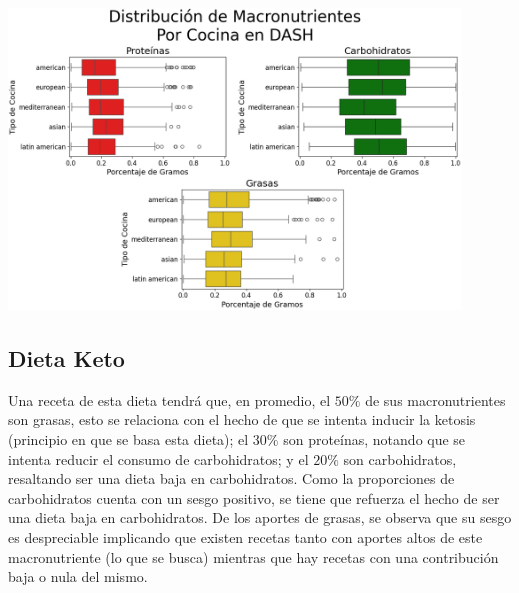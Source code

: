 \documentclass[12pt,a4paper]{article}
\begin{document}
{{            \begin{center}
                \includegraphics[width=0.9\textwidth]{Resources/EDA/Dash_2.png}
            \end{center}
        }

        \subsection{Dieta Keto}
        {
            Una receta de esta dieta tendrá que, en promedio, el $50\%$ de 
            sus macronutrientes son grasas, esto se relaciona con el hecho de 
            que se intenta inducir la ketosis (principio en que se basa esta         
            dieta); el $30\%$ son proteínas, notando que se intenta reducir 
            el consumo de carbohidratos; y el $20\%$ son carbohidratos, 
            resaltando ser una dieta baja en carbohidratos. Como la 
            proporciones de carbohidratos cuenta con un sesgo positivo, se 
            tiene que refuerza el hecho de ser una dieta baja en carbohidratos. 
            De los aportes de grasas, se observa que su sesgo es despreciable 
            implicando que existen recetas tanto con aportes altos de este 
            macronutriente (lo que se busca) mientras que hay recetas con 
            una contribución baja o nula del mismo.
        
}}
\end{document}
